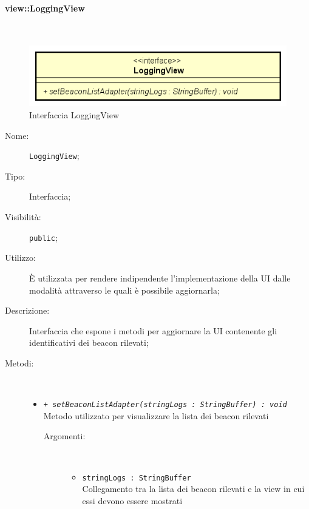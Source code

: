 \documentclass[../DefinizioneDiProdotto.tex]{subfiles}
\begin{document}
\paragraph{view::LoggingView}
\
\begin{figure}[H]
	\centering
	\includegraphics[width=\maxwidth]{img/LoggingView.png}
	\caption{Interfaccia LoggingView}\label{fig:view::LoggingView} 
\end{figure}
\begin{description}
	\item[Nome:] \texttt{LoggingView};
	\item[Tipo:] Interfaccia;
	\item[Visibilità:] \texttt{public};
	\item[Utilizzo:] È utilizzata per rendere indipendente l'implementazione della UI dalle modalità attraverso le quali è possibile aggiornarla;
	\item[Descrizione:] Interfaccia che espone i metodi per aggiornare la UI contenente gli identificativi dei beacon rilevati;
	\item[Metodi:] \
	\begin{itemize}
		\item \texttt{+ \textit{setBeaconListAdapter(stringLogs : StringBuffer) : void}}\\
		Metodo utilizzato per visualizzare la lista dei beacon rilevati 
		\begin{description}
			\item[Argomenti:] \
			\begin{itemize}
				\item \texttt{stringLogs : StringBuffer}\\
				Collegamento tra la lista dei beacon rilevati e la view in cui essi devono essere mostrati\end{itemize}
		\end{description}
	\end{itemize}
\end{description}
\end{document}
